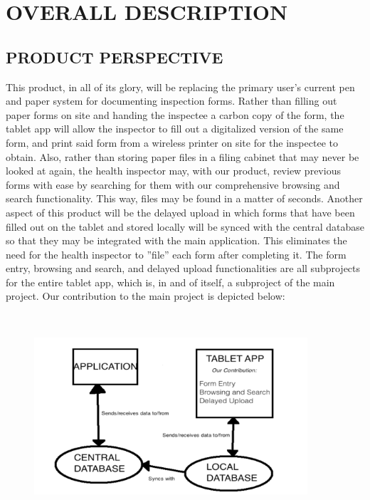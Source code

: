 \documentclass[twoside,letterpaper]{article}
\begin{document}


\clearpage\section[OVERALL
DESCRIPTION]{\rmfamily\bfseries\color{black}
OVERALL DESCRIPTION}

\subsection[PRODUCT
PERSPECTIVE]{\rmfamily\bfseries\color{black}
PRODUCT PERSPECTIVE}
This product, in all of its glory, will be replacing the primary user's current pen and paper system for documenting inspection forms. Rather than filling out paper forms on site and handing the inspectee a carbon copy of the form, the tablet app will allow the inspector to fill out a digitalized version of the same form, and print said form from a wireless printer on site for the inspectee to obtain. Also, rather than storing paper files in a filing cabinet that may never be looked at again, the health inspector may, with our product, review previous forms with ease by searching for them with our comprehensive browsing and search functionality. This way, files may be found in a matter of seconds. Another aspect of this product will be the delayed upload in which forms that have been filled out on the tablet and stored locally will be synced with the central database so that they may be integrated with the main application. This eliminates the need for the health inspector to ''file'' each form after completing it.
\newline
The form entry, browsing and search, and delayed upload functionalities are all subprojects for the entire tablet app, which is, in and of itself, a subproject of the main project. Our contribution to the main project is depicted below:

\begin{figure}[H]
\centering
\includegraphics[width=4in,height=3in]{Diagram1.png}
\end{figure}
\end{document}
